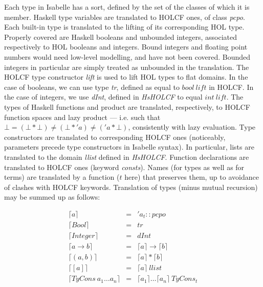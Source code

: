 \documentclass[a4paper,12pt]{article}
\begin{document}
Each type in Isabelle has a sort, defined by the set of the classes of
which it is member.  Haskell type variables are translated to HOLCF
ones, of class \emph{pcpo}. Each built-in type is translated to the
lifting of its corresponding HOL type. Properly covered are Haskell
booleans and unbounded integers, associated respectively to HOL
booleans and integers.
Bound integers and floating point numbers would need low-level
modelling, and have not been covered.  Bounded integers in particular
are simply treated as unbounded in the translation. The HOLCF type
constructor \emph{lift} is used to lift HOL types to flat domains.  In
the case of booleans, we can use type \emph{tr}, defined as equal to
$bool \ lift$ in HOLCF. In the case of integers, we use \emph{dInt},
defined in \emph{HsHOLCF} to equal $int \ lift$. The types of Haskell
functions and product are translated, respectively, to HOLCF function
spaces and lazy product --- i.e. such that $\bot = (\bot * \bot) \neq
(\bot*'a) \neq ('a * \bot)$, consistently with lazy evaluation. Type
constructors are translated to corresponding HOLCF ones (noticeably,
parameters precede type constructors in Isabelle syntax). In
particular, lists are translated to the domain \emph{llist} defined in
\emph{HsHOLCF}.  Function declarations are translated to HOLCF ones
(keyword \emph{consts}). Names (for types as well as for terms) are
translated by a function ($t$ here) that preserves them, up to
avoidance of clashes with HOLCF keywords. Translation of types (minus
mutual recursion) may be summed up as follows:


$$\begin{array}{lcl}
  \lceil a \rceil & = & 'a_{t}::pcpo \\
  \lceil Bool \rceil & = & tr \\
  \lceil Integer \rceil & = & dInt \\
  \lceil a \to b \rceil & = & \lceil a \rceil \to \lceil b \rceil \\
  \lceil (a,b) \rceil & = & \lceil a \rceil * \lceil b \rceil \\
  \lceil [a] \rceil & = & \lceil a \rceil \ llist \\
  \lceil TyCons \ a_{1} \ldots a_{n} \rceil & = & \lceil a_{1} \rceil \ldots \lceil a_{n} \rceil \ TyCons_{t} 
\end{array}$$
\end{document}
